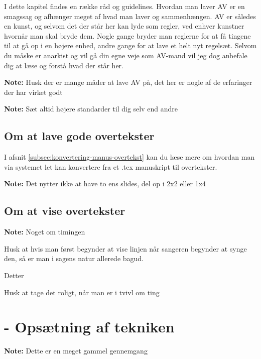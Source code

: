 \documentclass[10pt,a4paper,danish]{article}
\newcommand{\note}[1]{\begin{mdframed}[style=note]\textbf{Note:}
    #1\end{mdframed}}
\begin{document}
I dette kapitel findes en række råd og guidelines. Hvordan man laver AV er en
smagssag og afhænger meget af hvad man laver og sammenhængen. AV er således en
kunst, og selvom det der står her kan lyde som regler, ved enhver kunstner
hvornår man skal bryde dem. Nogle gange bryder man reglerne for at få tingene
til at gå op i en højere enhed, andre gange for at lave et helt nyt regelsæt.
Selvom du måske er anarkist og vil gå din egne veje som AV-mand vil jeg dog
anbefale dig at læse og forstå hvad der står her.

\note{Husk der er mange måder at lave AV på, det her er nogle af de erfaringer
  der har virket godt}

\note{Sæt altid højere standarder til dig selv end andre}

\subsection{Om at lave gode overtekster}




I afsnit \ref{subsec:konvertering-manus-overtekst} kan du læse mere om hvordan
man via systemet let kan konvertere fra et .tex manuskript til overtekster.



\note{Det nytter ikke at have to ens slides, del op i 2x2 eller 1x4}
\subsection{Om at vise overtekster}
\note{Noget om timingen}


Husk at hvis man først begynder at vise linjen når sangeren begynder at synge
den, så er man i sagens natur allerede bagud.

Detter

Husk at tage det roligt, når man er i tvivl om ting
\newpage
\section{- Opsætning af tekniken}
\note{Dette er en meget gammel gennemgang}
\end{document}
